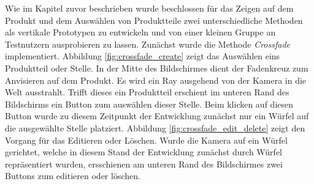 
Wie im Kapitel zuvor beschrieben wurde beschlossen für das Zeigen auf dem Produkt und dem Auswählen von Produktteile zwei unterschiedliche Methoden als vertikale Prototypen zu entwickeln und von einer kleinen Gruppe an Testnutzern ausprobieren zu lassen. 
Zunächst wurde die Methode \textit{Crossfade} implementiert. Abbildung \ref{fig:crossfade_create} zeigt das Auswählen eins Produktteil oder Stelle. In der Mitte des Bildschirmes dient der Fadenkreuz zum Anvisieren auf dem Produkt. Es wird ein Ray ausgehend von der 
Kamera in die Welt ausstrahlt. Trifft dieses ein Produktteil erschient im unteren Rand des Bildschirms ein Button zum auswählen dieser Stelle. Beim klicken auf diesen Button wurde zu diesem Zeitpunkt der Entwicklung zunächst nur ein Würfel auf die ausgewählte Stelle platziert.
Abbildung \ref{fig:crossfade_edit_delete} zeigt den Vorgang für das Editieren oder Löschen. Wurde die Kamera auf ein Würfel gerichtet, welche in diesem Stand der Entwicklung zunächst durch Würfel repräsentiert wurden, ersschienen am unteren Rand des Bildschirmes zwei Buttons zum editieren oder löschen. 

